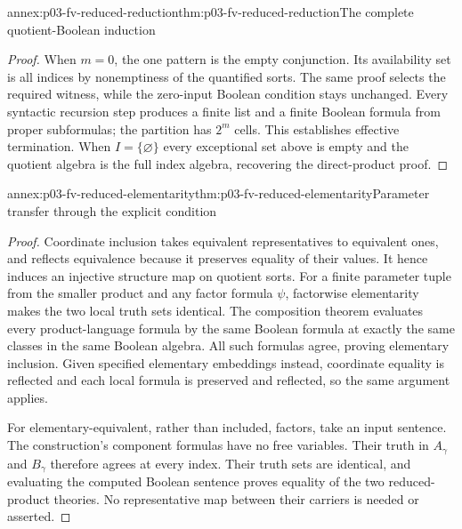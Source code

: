 \begin{annexitem}{annex:p03-fv-reduced-reduction}{thm:p03-fv-reduced-reduction}{The complete quotient-Boolean induction}
\begin{proof}
When \(m=0\), the one pattern is the empty conjunction. Its availability
set is all indices by nonemptiness of the quantified sorts. The same proof
selects the required witness, while the zero-input Boolean condition stays
unchanged. Every syntactic recursion step produces a finite list and a
finite Boolean formula from proper subformulas; the partition has \(2^m\)
cells. This establishes effective termination. When \(I=\{\varnothing\}\)
every exceptional set above is empty and the quotient algebra is the full
index algebra, recovering the direct-product proof.
\end{proof}
\end{annexitem}

\begin{annexitem}{annex:p03-fv-reduced-elementarity}{thm:p03-fv-reduced-elementarity}{Parameter transfer through the explicit condition}
\begin{proof}
Coordinate inclusion takes equivalent representatives to equivalent ones,
and reflects equivalence because it preserves equality of their values.
It hence induces an injective structure map on quotient sorts. For a finite
parameter tuple from the smaller product and any factor formula \(\psi\),
factorwise elementarity makes the two local truth sets identical. The
composition theorem evaluates every product-language formula by the same
Boolean formula at exactly the same classes in the same Boolean algebra.
All such formulas agree, proving elementary inclusion. Given specified
elementary embeddings instead, coordinate equality is reflected and each
local formula is preserved and reflected, so the same argument applies.

For elementary-equivalent, rather than included, factors, take an input
sentence. The construction's component formulas have no free variables.
Their truth in \(A_\gamma\) and \(B_\gamma\) therefore agrees at
every index. Their truth sets are identical, and evaluating the computed
Boolean sentence proves equality of the two reduced-product theories.
No representative map between their carriers is needed or asserted.
\end{proof}
\end{annexitem}

